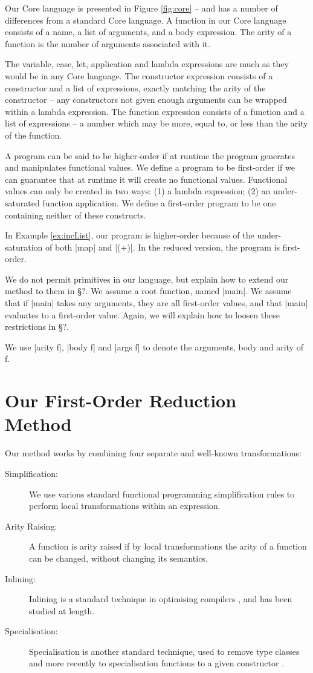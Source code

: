 \documentclass[preprint]{sigplanconf}
\begin{document}
Our Core language is presented in Figure \ref{fig:core} -- and has a number of differences from a standard Core language. A function in our Core language consists of a name, a list of arguments, and a body expression. The arity of a function is the number of arguments associated with it.

The variable, case, let, application and lambda expressions are much as they would be in any Core language. The constructor expression consists of a constructor and a list of expressions, exactly matching the arity of the constructor -- any constructors not given enough arguments can be wrapped within a lambda expression. The function expression consists of a function and a list of expressions -- a number which may be more, equal to, or less than the arity of the function.

A program can be said to be higher-order if at runtime the program generates and manipulates functional values. We define a program to be first-order if we can guarantee that at runtime it will create no functional values. Functional values can only be created in two ways: (1) a lambda expression; (2) an under-saturated function application. We define a first-order program to be one containing neither of these constructs.

In Example \ref{ex:incList}, our program is higher-order because of the under-saturation of both |map| and |(+)|. In the reduced version, the program is first-order.

We do not permit primitives in our language, but explain how to extend our method to them in \S?. We assume a root function, named |main|. We assume that if |main| takes any arguments, they are all first-order values, and that |main| evaluates to a first-order value. Again, we will explain how to loosen these restrictions in \S?.

We use |arity f|, |body f| and |args f| to denote the arguments, body and arity of f.


\section{Our First-Order Reduction Method}

Our method works by combining four separate and well-known transformations:

\begin{description}
\item[Simplification:] We use various standard functional programming simplification rules to perform local transformations within an expression.
\item[Arity Raising:] A function is arity raised \cite{arity_raising} if by local transformations the arity of a function can be changed, without changing its semantics.
\item[Inlining:] Inlining is a standard technique in optimising compilers \cite{spj:inline}, and has been studied at length.
\item[Specialisation:] Specialisation is another standard technique, used to remove type classes \cite{hudak:removing_type_classes} and more recently to specialisation functions to a given constructor \cite{spj:specconstr}.
\end{description}
\end{document}

